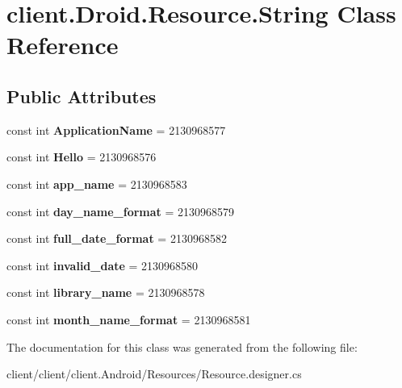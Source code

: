 \hypertarget{classclient_1_1Droid_1_1Resource_1_1String}{\section{client.\-Droid.\-Resource.\-String Class Reference}
\label{classclient_1_1Droid_1_1Resource_1_1String}
}
\subsection*{Public Attributes}
\begin{DoxyCompactItemize}
\item 
\hypertarget{classclient_1_1Droid_1_1Resource_1_1String_a2ff97e9dbef1a4032209189818b70305}{const int {\bfseries Application\-Name} = 2130968577}\label{classclient_1_1Droid_1_1Resource_1_1String_a2ff97e9dbef1a4032209189818b70305}

\item 
\hypertarget{classclient_1_1Droid_1_1Resource_1_1String_a3500308f583f5596af9ba12ea50cf1b8}{const int {\bfseries Hello} = 2130968576}\label{classclient_1_1Droid_1_1Resource_1_1String_a3500308f583f5596af9ba12ea50cf1b8}

\item 
\hypertarget{classclient_1_1Droid_1_1Resource_1_1String_ad3065420346771c01854fd7fb2e83ff6}{const int {\bfseries app\-\_\-name} = 2130968583}\label{classclient_1_1Droid_1_1Resource_1_1String_ad3065420346771c01854fd7fb2e83ff6}

\item 
\hypertarget{classclient_1_1Droid_1_1Resource_1_1String_ab66d4961fc83786397c29ee874133a26}{const int {\bfseries day\-\_\-name\-\_\-format} = 2130968579}\label{classclient_1_1Droid_1_1Resource_1_1String_ab66d4961fc83786397c29ee874133a26}

\item 
\hypertarget{classclient_1_1Droid_1_1Resource_1_1String_a4d49530f2361e61c537a2fb6dc27eace}{const int {\bfseries full\-\_\-date\-\_\-format} = 2130968582}\label{classclient_1_1Droid_1_1Resource_1_1String_a4d49530f2361e61c537a2fb6dc27eace}

\item 
\hypertarget{classclient_1_1Droid_1_1Resource_1_1String_a1b91c82805e2bb34bd5ccf72b637e683}{const int {\bfseries invalid\-\_\-date} = 2130968580}\label{classclient_1_1Droid_1_1Resource_1_1String_a1b91c82805e2bb34bd5ccf72b637e683}

\item 
\hypertarget{classclient_1_1Droid_1_1Resource_1_1String_a2c98b422c7afc8fa5d337524cda3710f}{const int {\bfseries library\-\_\-name} = 2130968578}\label{classclient_1_1Droid_1_1Resource_1_1String_a2c98b422c7afc8fa5d337524cda3710f}

\item 
\hypertarget{classclient_1_1Droid_1_1Resource_1_1String_ae9a72845395b46e3ce38ed29cd52e467}{const int {\bfseries month\-\_\-name\-\_\-format} = 2130968581}\label{classclient_1_1Droid_1_1Resource_1_1String_ae9a72845395b46e3ce38ed29cd52e467}

\end{DoxyCompactItemize}


The documentation for this class was generated from the following file\-:\begin{DoxyCompactItemize}
\item 
client/client/client.\-Android/\-Resources/Resource.\-designer.\-cs\end{DoxyCompactItemize}
